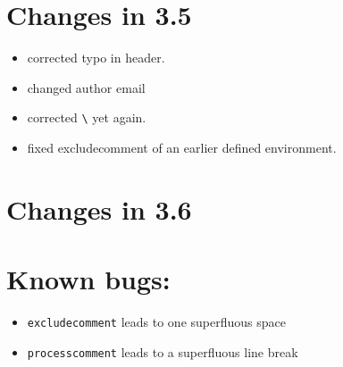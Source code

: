 \documentclass[parskip=false, DIV=8, headings=normal, pagesize=auto]{scrartcl}
\makeatletter
\newcommand*{\cs}[1]{\texttt{\textbackslash#1}}
\newcommand*{\cmd}[1]{\cs{\expandafter\@gobble\string#1}}
\makeatother
\begin{document}
  
\section{Changes in 3.5}

\begin{itemize}
\item corrected typo in header.
\item changed author email
\item corrected \cmd{\specialcomment} yet again.
\item fixed excludecomment of an earlier defined environment.
\end{itemize}


\section{Changes in 3.6}



\section{Known bugs:}

\begin{itemize}
\item \texttt{excludecomment} leads to one superfluous space
\item \texttt{processcomment} leads to a superfluous line break
\end{itemize}
\end{document}

